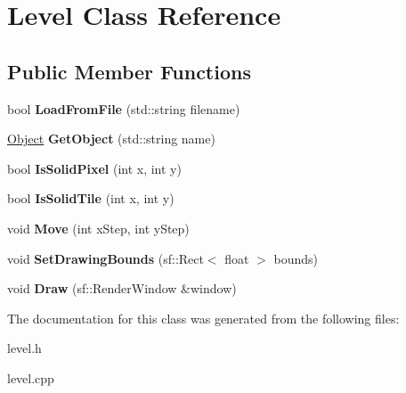 \hypertarget{class_level}{}\section{Level Class Reference}
\label{class_level}
\subsection*{Public Member Functions}
\begin{DoxyCompactItemize}
\item 
\mbox{\label{class_level_a1f10e04fbe066347b35705c01dc0b115}} 
bool {\bfseries Load\+From\+File} (std\+::string filename)
\item 
\mbox{\label{class_level_aafa37d550b85fed38e0159f5b257807f}} 
\hyperlink{class_object}{Object} {\bfseries Get\+Object} (std\+::string name)
\item 
\mbox{\label{class_level_afdaad3ce4e5188ae855ebda4257ffe8c}} 
bool {\bfseries Is\+Solid\+Pixel} (int x, int y)
\item 
\mbox{\label{class_level_aca8516e9f864821381f63bdeeb5dc944}} 
bool {\bfseries Is\+Solid\+Tile} (int x, int y)
\item 
\mbox{\label{class_level_ab49d6a53dd7bac6bba2a7ba83369100e}} 
void {\bfseries Move} (int x\+Step, int y\+Step)
\item 
\mbox{\label{class_level_a23e3a3c1294d54ddfcd7288ba481aba3}} 
void {\bfseries Set\+Drawing\+Bounds} (sf\+::\+Rect$<$ float $>$ bounds)
\item 
\mbox{\label{class_level_ae3c2bfbfc60cb52c1945eea100141f32}} 
void {\bfseries Draw} (sf\+::\+Render\+Window \&window)
\end{DoxyCompactItemize}


The documentation for this class was generated from the following files\+:\begin{DoxyCompactItemize}
\item 
level.\+h\item 
level.\+cpp\end{DoxyCompactItemize}
